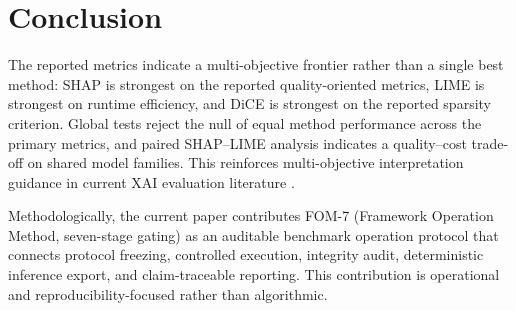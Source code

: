 \documentclass[twoside,11pt]{article}
\begin{document}
\section{Conclusion}
\label{sec:conclusion}
The reported metrics indicate a multi-objective frontier rather than a single
best method: SHAP is strongest on the reported quality-oriented metrics, LIME is
strongest on runtime efficiency, and DiCE is strongest on the reported sparsity
criterion. Global tests reject the null of equal method performance across the
primary metrics, and paired SHAP--LIME analysis indicates a quality--cost
trade-off on shared model families. This reinforces multi-objective
interpretation guidance in current XAI evaluation literature
\citep{pawlicki2024multiple,adadi2018xai,arrieta2020xai}.

Methodologically, the current paper contributes FOM-7 (Framework Operation Method, seven-stage gating) as an auditable benchmark operation
protocol that connects protocol freezing, controlled execution, integrity audit,
deterministic inference export, and claim-traceable reporting. This contribution
is operational and reproducibility-focused rather than algorithmic.
\end{document}

